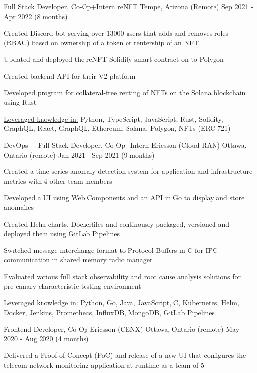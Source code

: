 \begin{cventries}
	\cventry
	{Full Stack Developer, Co-Op+Intern}
	{reNFT}
	{Tempe, Arizona (Remote)}
	{Sep 2021 - Apr 2022 (8 months)}
	{
		\begin{cvitems}
			\item{Created Discord bot serving over 13000 users that adds and removes roles (RBAC) based on ownership of a token or rentership of an NFT}
			\item{Updated and deployed the reNFT Solidity smart contract on to Polygon}
			\item{Created backend API for their V2 platform}
			\item{Developed program for collateral-free renting of NFTs on the Solana blockchain using Rust}
			\item{\underline{Leveraged knowledge in:} Python, TypeScript, JavaScript, Rust, Solidity, GraphQL, React, GraphQL, Ethereum, Solana, Polygon, NFTs (ERC-721)}
		\end{cvitems}
	}
	\cventry
	{DevOps + Full Stack Developer, Co-Op+Intern}
	{Ericsson (Cloud RAN)}
	{Ottawa, Ontario (remote)}
	{Jan 2021 - Sep 2021 (9 months)}
	{
		\begin{cvitems}
			\item{Created a time-series anomaly detection system for application and infrastructure metrics with 4 other team members}
			\item{Developed a UI using Web Components and an API in Go to display and store anomalies}
			\item{Created Helm charts, Dockerfiles and continously packaged, versioned and deployed them using GitLab Pipelines}
			\item{Switched message interchange format to Protocol Buffers in C for IPC communication in shared memory radio manager}
			\item{Evaluated various full stack observability and root cause analysis solutions for pre-canary characteristic testing environment}
			\item{\underline{Leveraged knowledge in:} Python, Go, Java, JavaScript, C, Kubernetes, Helm, Docker, Jenkins, Prometheus, InfluxDB, MongoDB, GitLab Pipelines}
		\end{cvitems}
	}
	\cventry
	{Frontend Developer, Co-Op}
	{Ericsson (CENX)}
	{Ottawa, Ontario (remote)}
	{May 2020 - Aug 2020 (4 months)}
	{
		\begin{cvitems}
			\item{Delivered a Proof of Concept (PoC) and release of a new UI that configures the telecom network monitoring application at runtime as a team of 5}

\end{cvitems}}
\end{cventries}
